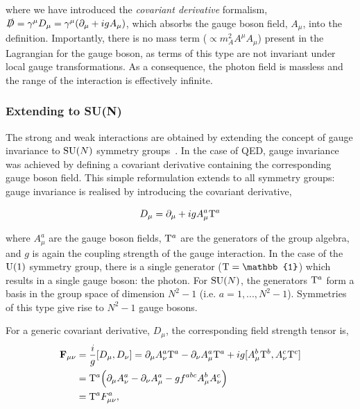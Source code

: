 \noindent
where we have introduced the \textit{covariant derivative} formalism, $\slashed{D} = \gamma^{\mu}D_\mu = \gamma^{\mu}(\partial_{\mu}+igA_\mu)$, which absorbs the gauge boson field, $A_\mu$, into the definition. Importantly, there is no mass term ($\propto m_A^2 A^{\mu}A_\mu$) present in the Lagrangian for the gauge boson, as terms of this type are not invariant under local gauge transformations. As a consequence, the photon field is massless and the range of the interaction is effectively infinite.

\subsubsection{Extending to {\rm{SU}}(N)}
The strong and weak interactions are obtained by extending the concept of gauge invariance to ${\rm{SU}}(N)$ symmetry groups~\cite{Aitchison:2004cs}. In the case of QED, gauge invariance was achieved by defining a covariant derivative containing the corresponding gauge boson field. This simple reformulation extends to all symmetry groups: gauge invariance is realised by introducing the covariant derivative, 

\begin{equation}
    D_\mu = \partial_\mu + i g A^a_\mu {\rm{T}}^a
\end{equation}

\noindent
where $A^a_\mu$ are the gauge boson fields, ${\rm{T}}^a$ are the generators of the group algebra, and $g$ is again the coupling strength of the gauge interaction. In the case of the ${\rm{U}}(1)$ symmetry group, there is a single generator (${\rm{T}}=\mathbb{1}$) which results in a single gauge boson: the photon. For ${\rm{SU}}(N)$, the generators ${\rm{T}}^a$ form a basis in the group space of dimension $N^2-1$ (i.e. $a=1,...,N^2-1$). Symmetries of this type give rise to $N^2-1$ gauge bosons.

For a generic covariant derivative, $D_\mu$, the corresponding field strength tensor is,
\begin{equation}
\begin{split}
    \mathbf{F}_{\mu\nu} &= \frac{i}{g}[D_\mu,D_\nu] = \partial_\mu A^a_\nu {\rm{T}}^a - \partial_\nu A^a_\mu {\rm{T}}^a + ig[A^b_\mu {\rm{T}}^b,A^c_\nu {\rm{T}}^c]
    \\
    &= {\rm{T}}^a \Big( \partial_\mu A^a_\nu-\partial_\nu A^a_\mu-gf^{abc}A^b_\mu A^c_\nu \Big) 
    \\
    &= {\rm{T}}^a F^a_{\mu\nu},
\end{split}
\end{equation}

